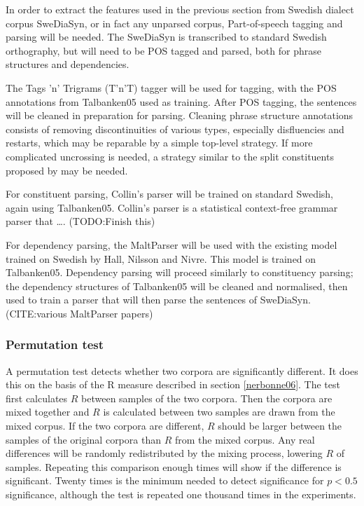 \documentclass[11pt]{article}
\begin{document}
In order to extract the features used in the previous section from
Swedish dialect corpus SweDiaSyn, or in fact any unparsed corpus,
Part-of-speech tagging and parsing will be needed.
The SweDiaSyn is transcribed to standard Swedish
orthography, but will need to be POS tagged and parsed, both for
phrase structures and dependencies.

The Tags 'n' Trigrams (T'n'T) tagger will be used for tagging, with
the POS annotations from Talbanken05 used as training.
After POS tagging, the sentences will be cleaned in preparation for
parsing. Cleaning phrase structure annotations consists of removing
discontinuities of various types, especially disfluencies and
restarts, which may be reparable by a simple top-level strategy. If
more complicated uncrossing is needed, a strategy similar to the split
constituents proposed by  may be needed.

For constituent parsing, Collin's parser will be trained on standard
Swedish, again using Talbanken05. Collin's parser is a statistical
context-free grammar parser that \ldots. (TODO:Finish this)

For dependency parsing, the MaltParser will be used with the existing
model trained on Swedish by Hall, Nilsson and Nivre. This model is
trained on Talbanken05.
Dependency parsing will proceed similarly to constituency parsing;
the dependency structures of Talbanken05 will be cleaned and
normalised, then used to train a parser that will then parse the
sentences of SweDiaSyn. (CITE:various MaltParser papers)


\subsubsection{Permutation test}
\label{permutationtest}

A permutation test detects whether two corpora are significantly
different. It does this on the basis of the R measure described in
section \ref{nerbonne06}. The test first calculates $R$ between
samples of the two corpora. Then the corpora are mixed together and
$R$ is calculated between two samples are drawn from the mixed
corpus. If the two corpora are different, $R$ should be larger between
the samples of the original corpora than $R$ from the mixed
corpus. Any real differences will be randomly redistributed by the
mixing process, lowering $R$ of samples. Repeating this comparison
enough times will show if the difference is significant. Twenty times
is the minimum needed to detect significance for $p < 0.5$
significance, although the test is repeated one thousand times in the
experiments.
\end{document}
